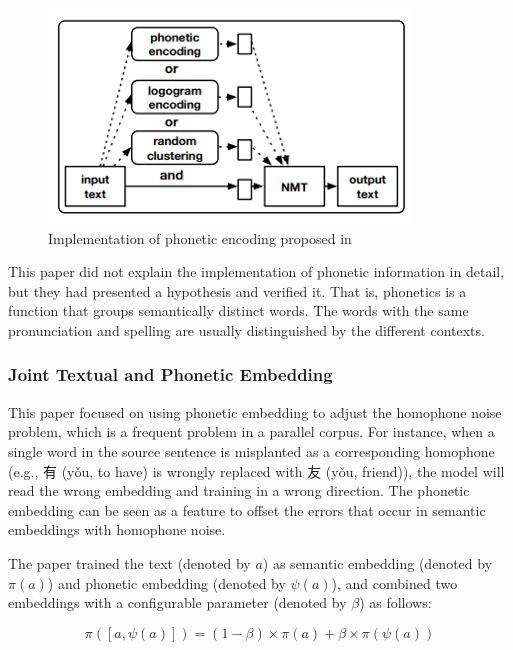 \begin{figure}[h]
	\centering
	\includegraphics[scale=0.9]{../images/phonetic_encoding.png}
	\caption{Implementation of phonetic encoding proposed in \cite{khan2019diversity}}
	\label{fig:phonetic1}
\end{figure}

This paper did not explain the implementation of phonetic information in detail, but they had presented a hypothesis and verified it. That is, phonetics is a function that groups semantically distinct words. The words with the same pronunciation and spelling are usually distinguished by the different contexts.

\newpage

\subsubsection{Joint Textual and Phonetic Embedding}

This paper \cite{liu-etal-2019-robust} focused on using phonetic embedding to adjust the homophone noise problem, which is a frequent problem in a parallel corpus. For instance, when a single word in the source sentence is misplanted as a corresponding homophone (e.g., 有 (yǒu, to have) is wrongly replaced with 友 (yǒu, friend)), the model will read the wrong embedding and training in a wrong direction. The phonetic embedding can be seen as a feature to offset the errors that occur in semantic embeddings with homophone noise.

The paper trained the text (denoted by $a$) as semantic embedding (denoted by $\pi(a)$) and phonetic embedding (denoted by $\psi(a)$), and combined two embeddings with a configurable parameter (denoted by $\beta$) as follows:

\begin{equation}
	\pi([a, \psi(a)]) = (1-\beta) \times \pi(a) + \beta \times \pi(\psi(a)) 
\end{equation}

